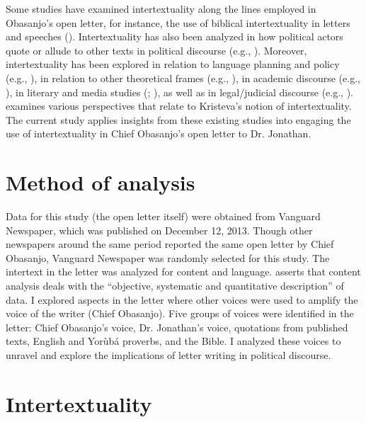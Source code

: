 \documentclass[output=paper,colorlinks,citecolor=brown]{langscibook}
\begin{document}
Some studies have examined intertextuality along the lines employed in Obasanjo's open letter, for instance, the use of biblical intertextuality in letters and speeches (\cite{Obeng2011, Obeng2016}). Intertextuality has also been analyzed in how political actors quote or allude to other texts in political discourse (e.g., \citealt{Hodges2008, Obeng2011, Obeng2016, Orwenjo2009}). Moreover, intertextuality has been explored in relation to language planning and policy (e.g., \cite{Johnson2015}), in relation to other theoretical frames (e.g., \cite{Fairclough1992b}), in academic discourse (e.g., \cite{Chandrasomaetal2004}), in literary and media studies (\cite{OttWalter2000}; \cite{Ho2011}), as well as in legal/judicial discourse (e.g., \cite{Matoesian1999}). \citet{Raj2015} examines various perspectives that relate to Kristeva’s notion of intertextuality. The current study applies insights from these existing studies into engaging the use of intertextuality in Chief Obasanjo’s open letter to Dr. Jonathan.

\section{Method of analysis}

Data for this study (the open letter itself) were obtained from Vanguard Newspaper, which was published on December 12, 2013. Though other newspapers around the same period reported the same open letter by Chief Obasanjo, Vanguard Newspaper was randomly selected for this study. The intertext in the letter was analyzed for content and language. \citet[18]{Berelson1957} asserts that content analysis deals with the “objective, systematic and quantitative description” of data. I explored aspects in the letter where other voices were used to amplify the voice of the writer (Chief Obasanjo). Five groups of voices were identified in the letter: Chief Obasanjo’s voice, Dr. Jonathan’s voice, quotations from published texts, English and Yorùbá proverbs, and the Bible. I analyzed these voices to unravel and explore the implications of letter writing in political discourse. 

\section{Intertextuality}
\end{document}
